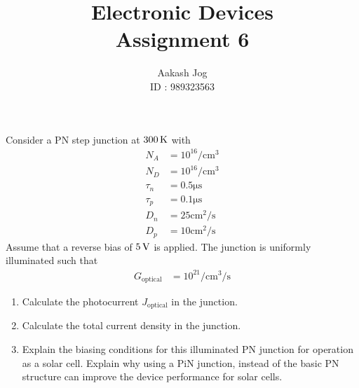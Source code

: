 \documentclass[fleqn, a4paper, 10pt, oneside]{amsart}
\title
[
	Electronic Devices : Assignment 6
]
{
	Electronic Devices\\
	Assignment 6
}
\author
{
	Aakash Jog\\
	ID : 989323563
}
\date{\formatdate{20}{4}{2016}}
\theoremstyle{definition}
\theoremstyle{theorem}
\begin{document}
\maketitle

\begin{question}
	Consider a PN step junction at $300 \kelvin$ with
	\begin{align*}
		N_A &= 10^{16} \si{\per\centi\metre\cubed}\\
		N_D &= 10^{16} \si{\per\centi\metre\cubed}\\
		\tau_n &= 0.5 \si{\micro\second}\\
		\tau_p &= 0.1 \si{\micro\second}\\
		D_n &= 25 \si{\centi\metre\squared\per\second}\\
		D_p &= 10 \si{\centi\metre\squared\per\second}
	\end{align*}
	Assume that a reverse bias of $5 \volt$ is applied.
	The junction is uniformly illuminated such that
	\begin{align*}
		G_{\text{optical}} &= 10^{21} \si{\per\centi\metre\cubed\per\second}
	\end{align*}
	\begin{enumerate}
		\item
			Calculate the photocurrent $J_{\text{optical}}$ in the junction.
		\item
			Calculate the total current density in the junction.
		\item
			Explain the biasing conditions for this illuminated PN junction for operation as a solar cell.
			Explain why using a PiN junction, instead of the basic PN structure can improve the device performance for solar cells.
	\end{enumerate}
\end{question}
\end{document}
